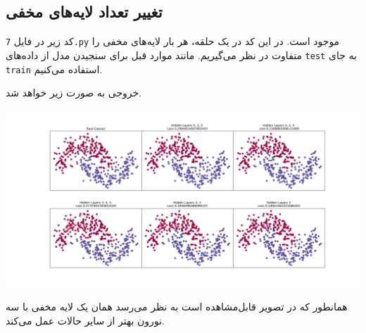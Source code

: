 \documentclass[a4paper, 12pt]{article}
\theoremstyle{definition}
\begin{document}
\subsection{تغییر تعداد لایه‌های مخفی}
کد زیر در فایل
\texttt{7.py}
موجود است. در این کد در یک حلقه، هر بار لایه‌های مخفی را متفاوت در نظر می‌گیریم. مانند موارد قبل برای سنجیدن مدل از داده‌های
\texttt{test}
به جای
\texttt{train}
استفاده می‌کنیم.

\LTR

\RTL

خروجی به صورت زیر خواهد شد.

\begin{center}
    \includegraphics[width=\textwidth]{figs/7.png}
\end{center}

همانطور که در تصویر قابل‌مشاهده است به نظر می‌رسد همان یک لایه مخفی با سه نورون بهتر از سایر حالات عمل می‌کند.
\end{document}
